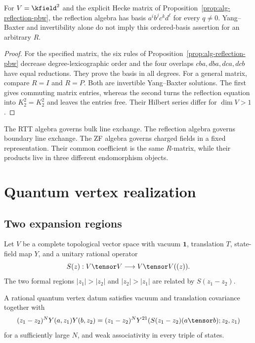 \begin{theorem}
For $V=\kfield^2$ and the explicit Hecke matrix of Proposition~\ref{prop:alg-reflection-pbw}, the reflection algebra has basis $a^i b^j c^k d^\ell$ for every $q\ne0$.
Yang--Baxter and invertibility alone do not imply this ordered-basis assertion for an arbitrary $R$.
\end{theorem}
\begin{proof}
For the specified matrix, the six rules of Proposition~\ref{prop:alg-reflection-pbw} decrease degree-lexicographic order and the four overlaps $cba,dba,dca,dcb$ have equal reductions.
They prove the basis in all degrees.
For a general matrix, compare $R=I$ and $R=P$.
Both are invertible Yang--Baxter solutions.
The first gives commuting matrix entries, whereas the second turns the reflection equation into $K_2^2=K_2^2$ and leaves the entries free.
Their Hilbert series differ for $\dim V>1$.
\end{proof}

The RTT algebra governs bulk line exchange.  The reflection algebra governs boundary line exchange.  The ZF algebra governs charged fields in a fixed representation.  Their common coefficient is the same $R$-matrix, while their products live in three different endomorphism objects.

\chapter{Quantum vertex realization}
\section{Two expansion regions}
Let $V$ be a complete topological vector space with vacuum $\mathbf1$, translation $T$, state-field map $Y$, and a unitary rational operator
\[
 S(z):V\tensor V\longrightarrow V\tensor V((z)).
\]
The two formal regions $|z_1|>|z_2|$ and $|z_2|>|z_1|$ are related by $S(z_1-z_2)$.

\begin{definition}
A rational quantum vertex datum satisfies vacuum and translation covariance together with
\begin{equation}\label{eq:vol1-s-locality}
 (z_1-z_2)^N Y(a,z_1)Y(b,z_2)
 =(z_1-z_2)^N
 Y^{21}\!\left(S(z_1-z_2)(a\tensor b);z_2,z_1\right)
\end{equation}
for a sufficiently large $N$, and weak associativity in every triple of states.
\end{definition}

